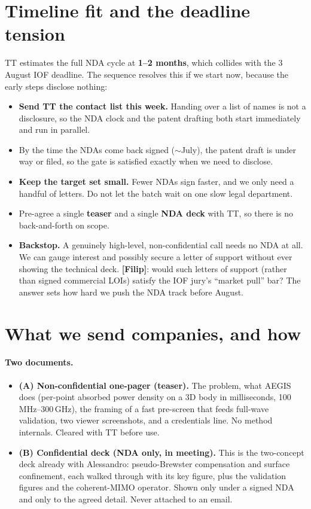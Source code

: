 \documentclass[11pt,a4paper]{article}
\newcommand{\owner}[1]{\textbf{[#1]}}
\begin{document}
\section{Timeline fit and the deadline tension}
TT estimates the full NDA cycle at \textbf{1--2 months}, which collides with the 3 August IOF deadline. The
sequence resolves this if we start now, because the early steps disclose nothing:
\begin{itemize}
  \item \textbf{Send TT the contact list this week.} Handing over a list of names is not a disclosure, so the NDA clock and the patent drafting both start immediately and run in parallel.
  \item By the time the NDAs come back signed ($\sim$July), the patent draft is under way or filed, so the gate is satisfied exactly when we need to disclose.
  \item \textbf{Keep the target set small.} Fewer NDAs sign faster, and we only need a handful of letters. Do not let the batch wait on one slow legal department.
  \item Pre-agree a single \textbf{teaser} and a single \textbf{NDA deck} with TT, so there is no back-and-forth on scope.
  \item \textbf{Backstop.} A genuinely high-level, non-confidential call needs no NDA at all. We can gauge interest and possibly secure a letter of support without ever showing the technical deck. \owner{Filip}: would such letters of support (rather than signed commercial LOIs) satisfy the IOF jury's ``market pull'' bar? The answer sets how hard we push the NDA track before August.
\end{itemize}

\section{What we send companies, and how}
\paragraph{Two documents.}
\begin{itemize}
  \item \textbf{(A) Non-confidential one-pager (teaser).} The problem, what AEGIS does (per-point absorbed power density on a 3D body in milliseconds, 100\,MHz--300\,GHz), the framing of a fast pre-screen that feeds full-wave validation, two viewer screenshots, and a credentials line. No method internals. Cleared with TT before use.
  \item \textbf{(B) Confidential deck (NDA only, in meeting).} This is the two-concept deck already with Alessandro: pseudo-Brewster compensation and surface confinement, each walked through with its key figure, plus the validation figures and the coherent-MIMO operator. Shown only under a signed NDA and only to the agreed detail. Never attached to an email.
\end{itemize}
\end{document}
